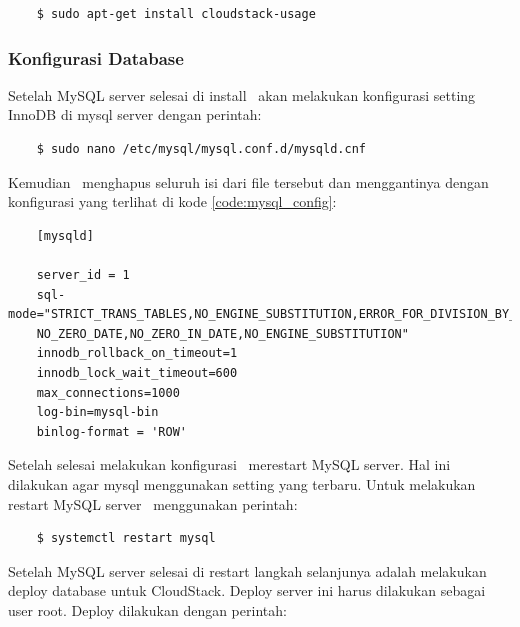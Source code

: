 \begin{listing}[H]
    \begin{verbatim}  
    $ sudo apt-get install cloudstack-usage
    \end{verbatim}
\end{listing}

\subsubsection{Konfigurasi Database}
Setelah MySQL server selesai di install \saya\ akan melakukan konfigurasi setting InnoDB di mysql server dengan perintah:

\begin{listing}[H]
    \begin{verbatim}      
    $ sudo nano /etc/mysql/mysql.conf.d/mysqld.cnf
    \end{verbatim}
\end{listing}

Kemudian \saya\ menghapus seluruh isi dari file tersebut dan menggantinya dengan konfigurasi yang terlihat di kode \ref{code:mysql_config}:

\begin{listing}[H]
    \begin{verbatim}
    [mysqld]

    server_id = 1
    sql-mode="STRICT_TRANS_TABLES,NO_ENGINE_SUBSTITUTION,ERROR_FOR_DIVISION_BY_ZERO
    NO_ZERO_DATE,NO_ZERO_IN_DATE,NO_ENGINE_SUBSTITUTION"
    innodb_rollback_on_timeout=1
    innodb_lock_wait_timeout=600
    max_connections=1000
    log-bin=mysql-bin
    binlog-format = 'ROW'
    \end{verbatim}
    \caption{Konfigurasi mysqld.cnf}
    \label{code:mysql_config}
\end{listing}

Setelah selesai melakukan konfigurasi \saya\ merestart MySQL server. Hal ini dilakukan agar mysql menggunakan setting yang terbaru. Untuk melakukan restart MySQL server \saya\ menggunakan perintah:

\begin{listing}[H]
    \begin{verbatim}     
    $ systemctl restart mysql
    \end{verbatim}
\end{listing}

Setelah MySQL server selesai di restart langkah selanjunya adalah melakukan deploy database untuk CloudStack. Deploy server ini harus dilakukan sebagai user root. Deploy dilakukan dengan perintah:

